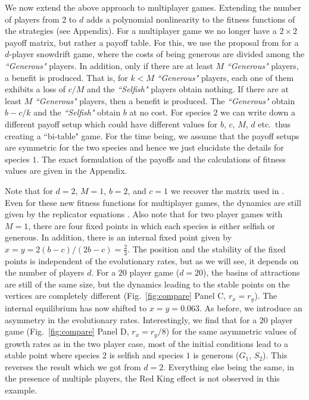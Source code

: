 \documentclass[aps,pre,amsfonts,floatfix, onecolumn,showkeys]{revtex4-1}
\begin{document}
We now extend the above approach to multiplayer games.
Extending the number of players from 2 to $d$ adds a polynomial nonlinearity to the fitness functions of the strategies (see Appendix).
For a multiplayer game we no longer have a $2 \times 2$ payoff matrix, but rather a payoff table. 
For this, we use the proposal from \cite{souza:JTB:2009} for a $d$-player snowdrift game, where the costs of being generous are divided among the \textit{``Generous"} players. 
In addition, only if there are at least $M$ \textit{``Generous"} players, a benefit is produced.
That is, for $k<M$ \textit{``Generous"} players, each one of them exhibits a loss of $c/M$ and the \textit{``Selfish"} players obtain nothing.
If there are at least $M$ \textit{``Generous"} players, then a benefit is produced. The \textit{``Generous"} obtain $b - c/k$ and the \textit{``Selfish"} obtain $b$ at no cost.
For species $2$ we can write down a different payoff setup which could have different values for $b$, $c$, $M$, $d$ etc.\ thus creating a ``bi-table" game.
For the time being, we assume that the payoff setups are symmetric for the two species and hence we just elucidate the details for species $1$.
The exact formulation of the payoffs and the calculations of fitness values are given in the Appendix.

Note that for $d=2$, $M=1$, $b=2$, and $c=1$ we recover the matrix used in \cite{bergstrom:PNAS:2003}.
Even for these new fitness functions for multiplayer games, the dynamics are still given by the replicator equations \cite{hauert:JTB:2006a,pacheco:PRSB:2009,gokhale:PNAS:2010}.
Also note that for two player games with $M=1$, there are four fixed points in which each species is either selfish or generous.
In addition, there is an internal fixed point given by $x = y = 2 (b-c)/(2 b - c) = \frac{2}{3}$.
The position and the stability of the fixed points is independent of the evolutionary rates, but as we will see, it depends on the number of players $d$.
For a $20$ player game ($d=20$), the basins of attractions are still of the same size, but the dynamics leading to the stable points on the vertices are completely different (Fig.~\ref{fig:compare} Panel C, $r_x=r_y$).
The internal equilibrium has now shifted to $x = y = 0.063$.
As before, we introduce an asymmetry in the evolutionary rates.
Interestingly, we find that for a $20$ player game (Fig.~\ref{fig:compare} Panel D, $r_x=r_y/8$) for the same asymmetric values of growth rates as in the two player case, most of the initial conditions lead to a stable point where species $2$ is selfish and species $1$ is generous ($G_1$, $S_2$).
This  reverses the result which we got from $d=2$.
Everything else being the same, in the presence of multiple players, the Red King effect is not observed in this example.
\end{document}
